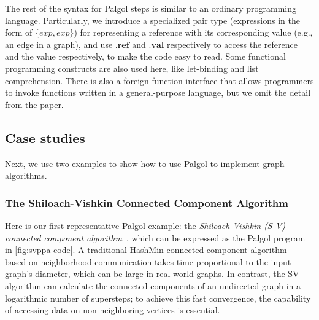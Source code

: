 \documentclass{sokendai_thesis} %
\begin{document}
The rest of the syntax for Palgol steps is similar to an ordinary programming language.
Particularly, we introduce a specialized pair type (expressions in the form of $\{\mathit{exp},\mathit{exp}\}$) for representing a reference with its corresponding value (e.g., an edge in a graph), and use $.\mathbf{ref}$ and $.\mathbf{val}$ respectively to access the reference and the value respectively, to make the code easy to read.
Some functional programming constructs are also used here, like let-binding and list comprehension.
There is also a foreign function interface that allows programmers to invoke functions written in a general-purpose language, but we omit the detail from the paper.

\subsection{Case studies}

Next, we use two examples to show how to use Palgol to implement graph algorithms.

\subsubsection{The Shiloach-Vishkin Connected Component Algorithm}
\label{sec:sv-algorithm}

Here is our first representative Palgol example: the \emph{Shiloach-Vishkin (S-V) connected component algorithm}~\cite{yan2015effective}, which can be expressed as the Palgol program in \autoref{fig:svppa-code}.
A traditional HashMin connected component algorithm~\cite{yan2015effective} based on neighborhood communication takes time proportional to the input graph's diameter, which can be large in real-world graphs.
In contrast, the SV algorithm can calculate the connected components of an undirected graph in a logarithmic number of supersteps; to achieve this fast convergence, the capability of accessing data on non-neighboring vertices is essential.
\end{document}
